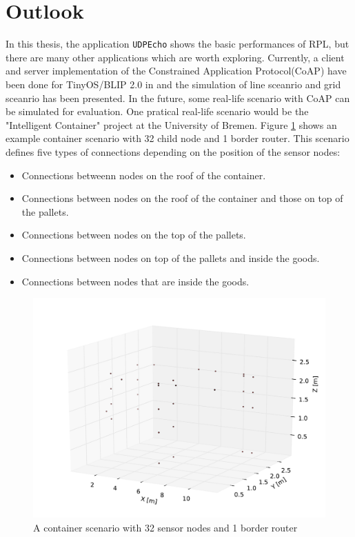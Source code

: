 \section{Outlook}
\label{outlook}

In this thesis, the application \texttt{UDPEcho} shows the basic performances of RPL, but there are many other applications which are worth exploring. Currently, a client and server implementation of the
Constrained Application Protocol(CoAP) have been done for TinyOS/BLIP 2.0 in \cite{TP11} and the simulation of line sceanrio and grid sceanrio has been presented. In the future, some real-life scenario with CoAP can be simulated for evaluation. One pratical real-life scenario would be the "Intelligent Container" project at the University of Bremen. Figure \ref{fig:container} shows an example container scenario with 32 child node and 1 border router. This scenario defines five types of connections depending on the position of the sensor nodes: 
\begin{itemize}
\item Connections betweenn nodes on the roof of the container.
\item Connections between nodes on the roof of the container and those on top of the pallets.
\item Connections between nodes on the top of the pallets.
\item Connections between nodes on top of the pallets and inside the goods.
\item Connections between nodes that are inside the goods.
\end{itemize}

\begin{figure}[htbp]
  \begin{center}
    \leavevmode
      \includegraphics[scale=0.45]
      {Pics/container.pdf}
   \caption{A container scenario with 32 sensor nodes and 1 border router}
    \label{fig:container}
  \end{center}
\end{figure} 
 

